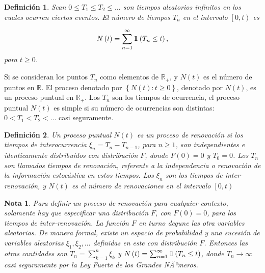 \documentclass{article}
\newtheorem{Def}{Definición}
\newtheorem{Note}{Nota}
\newcommand{\rea}{\mathbb{R}}
\newcommand{\indora}{\mbox{$1$\hspace{-0.8ex}$1$}}
\begin{document}

\begin{Def}%
Sean $0\leq T_{1}\leq T_{2}\leq \ldots$ son tiempos aleatorios infinitos en los cuales ocurren ciertos eventos. El n\'umero de tiempos $T_{n}$ en el intervalo $\left[0,t\right)$ es

\begin{eqnarray}
N\left(t\right)=\sum_{n=1}^{\infty}\indora\left(T_{n}\leq t\right),
\end{eqnarray}
para $t\geq0$.
\end{Def}

Si se consideran los puntos $T_{n}$ como elementos de $\rea_{+}$, y $N\left(t\right)$ es el n\'umero de puntos en $\rea$. El proceso denotado por $\left\{N\left(t\right):t\geq0\right\}$, denotado por $N\left(t\right)$, es un proceso puntual en $\rea_{+}$. Los $T_{n}$ son los tiempos de ocurrencia, el proceso puntual $N\left(t\right)$ es simple si su n\'umero de ocurrencias son distintas: $0<T_{1}<T_{2}<\ldots$ casi seguramente.

\begin{Def}
Un proceso puntual $N\left(t\right)$ es un proceso de renovaci\'on si los tiempos de interocurrencia $\xi_{n}=T_{n}-T_{n-1}$, para $n\geq1$, son independientes e identicamente distribuidos con distribuci\'on $F$, donde $F\left(0\right)=0$ y $T_{0}=0$. Los $T_{n}$ son llamados tiempos de renovaci\'on, referente a la independencia o renovaci\'on de la informaci\'on estoc\'astica en estos tiempos. Los $\xi_{n}$ son los tiempos de inter-renovaci\'on, y $N\left(t\right)$ es el n\'umero de renovaciones en el intervalo $\left[0,t\right)$
\end{Def}


\begin{Note}
Para definir un proceso de renovaci\'on para cualquier contexto, solamente hay que especificar una distribuci\'on $F$, con $F\left(0\right)=0$, para los tiempos de inter-renovaci\'on. La funci\'on $F$ en turno degune las otra variables aleatorias. De manera formal, existe un espacio de probabilidad y una sucesi\'on de variables aleatorias $\xi_{1},\xi_{2},\ldots$ definidas en este con distribuci\'on $F$. Entonces las otras cantidades son $T_{n}=\sum_{k=1}^{n}\xi_{k}$ y $N\left(t\right)=\sum_{n=1}^{\infty}\indora\left(T_{n}\leq t\right)$, donde $T_{n}\rightarrow\infty$ casi seguramente por la Ley Fuerte de los Grandes NÃºmeros.
\end{Note}
\end{document}
